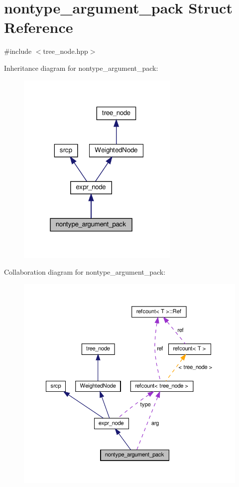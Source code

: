 \hypertarget{structnontype__argument__pack}{}\section{nontype\+\_\+argument\+\_\+pack Struct Reference}
\label{structnontype__argument__pack}


{\ttfamily \#include $<$tree\+\_\+node.\+hpp$>$}



Inheritance diagram for nontype\+\_\+argument\+\_\+pack\+:
\nopagebreak
\begin{figure}[H]
\begin{center}
\leavevmode
\includegraphics[width=220pt]{dd/df8/structnontype__argument__pack__inherit__graph}
\end{center}
\end{figure}


Collaboration diagram for nontype\+\_\+argument\+\_\+pack\+:
\nopagebreak
\begin{figure}[H]
\begin{center}
\leavevmode
\includegraphics[width=350pt]{d4/d27/structnontype__argument__pack__coll__graph}
\end{center}
\end{figure}
